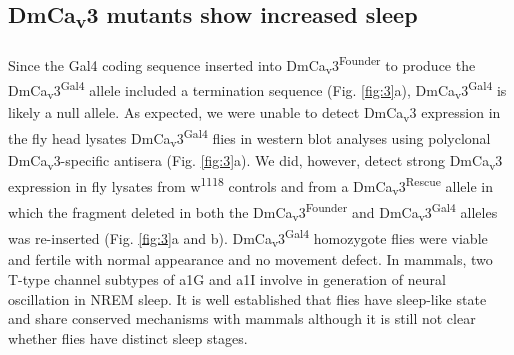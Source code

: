\subsection*{DmCa\textsubscript{v}3 mutants show increased sleep}

Since the Gal4 coding sequence inserted into DmCa\textsubscript{v}3\textsuperscript{Founder} to produce the DmCa\textsubscript{v}3\textsuperscript{Gal4} allele included a termination sequence (Fig. \ref{fig:3}a), DmCa\textsubscript{v}3\textsuperscript{Gal4} is likely a null allele.
As expected, we were unable to detect DmCa\textsubscript{v}3 expression in the fly head lysates DmCa\textsubscript{v}3\textsuperscript{Gal4} flies in western blot analyses using polyclonal DmCa\textsubscript{v}3-specific antisera (Fig. \ref{fig:3}a). We did, however, detect strong DmCa\textsubscript{v}3 expression in fly lysates from w\textsuperscript{1118} controls and from a DmCa\textsubscript{v}3\textsuperscript{Rescue} allele in which the fragment deleted in both the DmCa\textsubscript{v}3\textsuperscript{Founder} and DmCa\textsubscript{v}3\textsuperscript{Gal4} alleles was re-inserted (Fig. \ref{fig:3}a and b).
DmCa\textsubscript{v}3\textsuperscript{Gal4} homozygote flies were viable and fertile with normal appearance and no movement defect.
In mammals, two T-type channel subtypes of a1G and a1I involve in generation of neural oscillation in NREM sleep.
It is well established that flies have sleep-like state and share conserved mechanisms with mammals although it is still not clear whether flies have distinct sleep stages.

